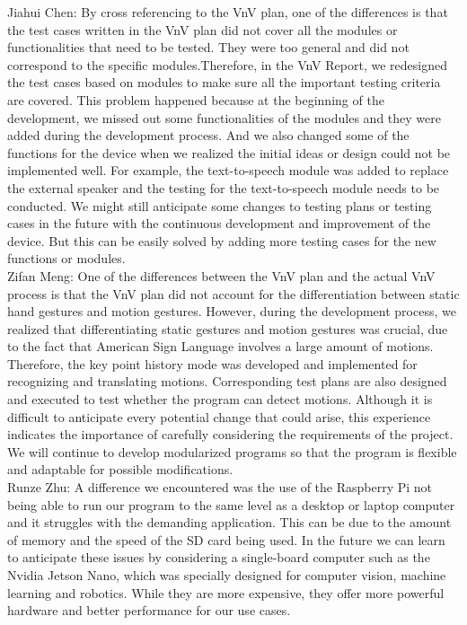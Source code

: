 \documentclass[12pt, titlepage]{article}
\begin{document}
\begin{enumerate}
  Jiahui Chen: By cross referencing to the VnV plan, one of the differences is that the test cases written in the VnV plan did not cover all the modules or functionalities that need to be tested. They were too general and did not correspond to the specific modules.Therefore, in the VnV Report, we redesigned the test cases based on modules to make sure all the important testing criteria are covered. This problem happened because at the beginning of the development, we missed out some functionalities of the modules and they were added during the development process. And we also changed some of the functions for the device when we realized the initial ideas or design could not be implemented well. For example, the text-to-speech module was added to replace the external speaker and the testing for the text-to-speech module needs to be conducted. We might still anticipate some changes to testing plans or testing cases in the future with the continuous development and improvement of the device. But this can be easily solved by adding more testing cases for the new functions or modules.\\

  Zifan Meng: One of the differences between the VnV plan and the actual VnV process is that the VnV plan did not  account for the differentiation between static hand gestures and motion gestures. However, during the development process, we realized that differentiating static gestures and motion gestures was crucial, due to the fact that American Sign Language involves a large amount of motions. Therefore, the key point history mode was developed and implemented for recognizing and translating motions. Corresponding test plans are also designed and executed to test whether the program can detect motions. Although it is difficult to anticipate every potential change that could arise, this experience indicates the importance of carefully considering the requirements of the project. We will continue to develop modularized programs so that the program is flexible and adaptable for possible modifications.\\
  
  Runze Zhu: A difference we encountered was the use of the Raspberry Pi not being able to run our program to the same level as a desktop or laptop computer and it struggles with the demanding application. This can be due to the amount of memory and the speed of the SD card being used. In the future we can learn to anticipate these issues by considering a single-board computer such as the Nvidia Jetson Nano, which was specially designed for computer vision, machine learning and robotics. While they are more expensive, they offer more powerful hardware and better performance for our use cases.

\end{enumerate}
\end{document}
